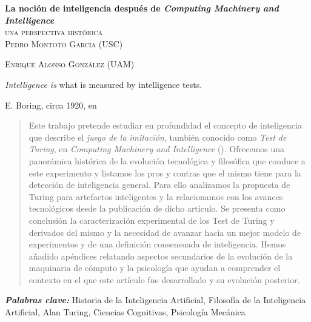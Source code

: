 \documentclass[12pt]{memoir}
\makeatletter
\newlength\drop
\newcommand*\titleM{\begingroup%
\setlength\drop{0.08\textheight}
\centering
\vspace*{\drop}
{\Huge\bfseries La noción de inteligencia después de \textit{Computing Machinery and Intelligence}}\\[\baselineskip]
{\scshape una perspectiva histórica}\\[\baselineskip]
\vfill
{\large\scshape Pedro Montoto García (USC)}\par
{\large\scshape Enrique Alonso González (UAM)}\par
\vfill
{\scshape \@date}\par
\vspace*{2\drop}
\endgroup}
\providecommand{\keywords}[2]{
	\textbf{\textit{#1: }} #2
}
\makeatother
\begin{document}
\pagestyle{empty}


\begin{titlingpage}
\titleM
\end{titlingpage}

\OnehalfSpacing



\setlength{\epigraphwidth}{0.8\textwidth}
\thispagestyle{empty}
\epigraph{\flqq\textit{Intelligence is} what is measured by intelligence tests.\frqq}{E. Boring, circa 1920, en \cite{intDefs}}

\newpage


\thispagestyle{empty}
\begin{abstract}
	Este trabajo pretende estudiar en profundidad el concepto de inteligencia que describe el \textit{juego de la imitación}, también conocido como \textit{Test de Turing}, en \textit{Computing Machinery and Intelligence} (\cite{Turing1950cmi}). Ofrecemos una panorámica histórica de la evolución tecnológica y filosófica que conduce a este experimento y listamos los pros y contras que el mismo tiene para la detección de inteligencia general. Para ello analizamos la propuesta de Turing para artefactos inteligentes y la relacionamos con los avances tecnológicos desde la publicación de dicho artículo. Se presenta como conclusión la caracterización experimental de los Test de Turing y derivados del mismo y la necesidad de avanzar hacia un mejor modelo de experimentos y de una definición consensuada de inteligencia. Hemos añadido apéndices relatando aspectos secundarios de la evolución de la maquinaria de cómputo y la psicología que ayudan a comprender el contexto en el que este artículo fue desarrollado y su evolución posterior.
\end{abstract}

\nocite{Nilsson2009}

\keywords{Palabras clave}{Historia de la Inteligencia Artificial, Filosofía de la Inteligencia Artificial, Alan Turing, Ciencias Cognitivas, Psicología Mecánica}
\end{document}
